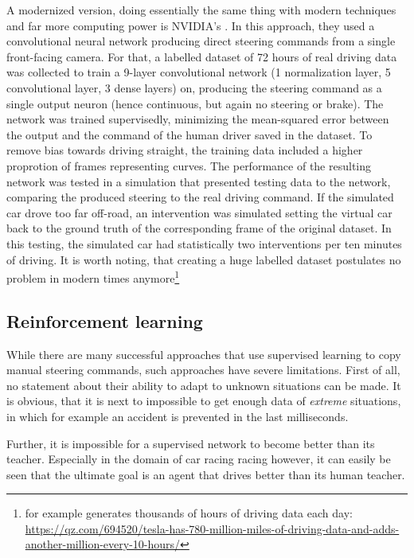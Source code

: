 A modernized version, doing essentially the same thing with modern techniques and far more computing power is NVIDIA's \cite{bojarski_end_2016}. In this approach, they used a convolutional neural network producing direct steering commands from a single front-facing camera. For that, a labelled dataset of 72 hours of real driving data was collected to train a 9-layer convolutional network (1 normalization layer, 5 convolutional layer, 3 dense layers) on, producing the steering command as a single output neuron (hence continuous, but again no steering or brake). The network was trained supervisedly, minimizing the mean-squared error between the output and the command of the human driver saved in the dataset. To remove bias towards driving straight, the training data included a higher proprotion of frames representing curves. 
The performance of the resulting network was tested in a simulation that presented testing data to the network, comparing the produced steering to the real driving command. If the simulated car drove too far off-road, an intervention was simulated setting the virtual car back to the ground truth of the corresponding frame of the original dataset. In this testing, the simulated car had statistically two interventions per ten minutes of driving. It is worth noting, that creating a huge labelled dataset postulates no problem in modern times anymore\footnote{ for example generates thousands of hours of driving data each day: \url{https://qz.com/694520/tesla-has-780-million-miles-of-driving-data-and-adds-another-million-every-10-hours/}}


\subsection{Reinforcement learning}

While there are many successful approaches that use supervised learning to copy manual steering commands, such approaches have severe limitations. First of all, no statement about their ability to adapt to unknown situations can be made. It is obvious, that it is next to impossible to get enough data of \textit{extreme} situations, in which for example an accident is prevented in the last milliseconds.

Further, it is impossible for a supervised network to become better than its teacher. Especially in the domain of car racing racing however, it can easily be seen that the ultimate goal is an agent that drives better than its human teacher.

